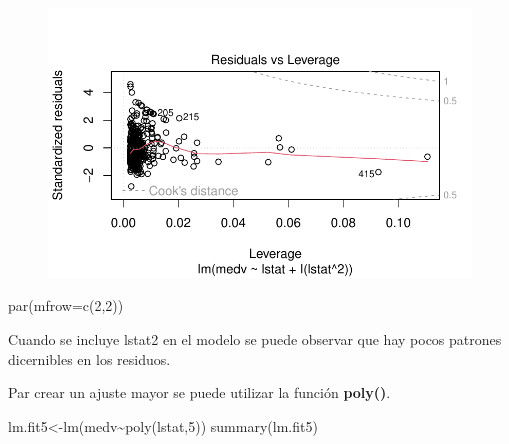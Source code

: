 \documentclass[
  letterpaper,
  DIV=11,
  numbers=noendperiod]{scrartcl}
\newenvironment{Shaded}{\begin{snugshade}}{\end{snugshade}}
\newcommand{\AttributeTok}[1]{\textcolor[rgb]{0.40,0.45,0.13}{#1}}
\newcommand{\DecValTok}[1]{\textcolor[rgb]{0.68,0.00,0.00}{#1}}
\newcommand{\FunctionTok}[1]{\textcolor[rgb]{0.28,0.35,0.67}{#1}}
\newcommand{\NormalTok}[1]{\textcolor[rgb]{0.00,0.23,0.31}{#1}}
\newcommand{\OtherTok}[1]{\textcolor[rgb]{0.00,0.23,0.31}{#1}}
\newcommand{\SpecialCharTok}[1]{\textcolor[rgb]{0.37,0.37,0.37}{#1}}
\begin{document}
\begin{figure}[H]

{\centering \includegraphics{Resumen-2---3_files/figure-pdf/unnamed-chunk-21-4.pdf}

}

\end{figure}

\begin{Shaded}
\begin{Highlighting}[]
\FunctionTok{par}\NormalTok{(}\AttributeTok{mfrow=}\FunctionTok{c}\NormalTok{(}\DecValTok{2}\NormalTok{,}\DecValTok{2}\NormalTok{))}
\end{Highlighting}
\end{Shaded}

Cuando se incluye lstat2 en el modelo se puede observar que hay pocos
patrones dicernibles en los residuos.

Par crear un ajuste mayor se puede utilizar la función \textbf{poly()}.

\begin{Shaded}
\begin{Highlighting}[]
\NormalTok{lm.fit5}\OtherTok{\textless{}{-}}\FunctionTok{lm}\NormalTok{(medv}\SpecialCharTok{\textasciitilde{}}\FunctionTok{poly}\NormalTok{(lstat,}\DecValTok{5}\NormalTok{))}
\FunctionTok{summary}\NormalTok{(lm.fit5)}
\end{Highlighting}
\end{Shaded}
\end{document}
